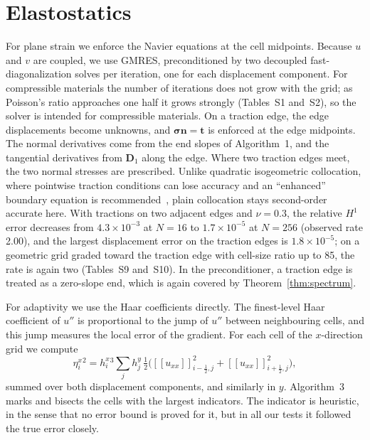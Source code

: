 \documentclass[preprint,12pt]{elsarticle}
\theoremstyle{remark}
\begin{document}
\section{Elastostatics}\label{sec:elast}
For plane strain we enforce the Navier equations at the cell midpoints. Because $u$ and $v$ are coupled,
we use GMRES, preconditioned by two decoupled fast-diagonalization solves per iteration, one for each
displacement component. For compressible materials the number of iterations does not grow with the grid;
as Poisson's ratio approaches one half it grows strongly (Tables~S1 and~S2), so the solver is intended for
compressible materials. On a traction edge, the edge displacements become unknowns, and
$\boldsymbol\sigma\mathbf n=\mathbf t$ is enforced at the edge midpoints. The normal derivatives come from
the end slopes of Algorithm~1, and the tangential derivatives from $\mathbf D_1$ along the edge. Where two traction
edges meet, the two normal stresses are prescribed. Unlike quadratic isogeometric collocation, where
pointwise traction conditions can lose accuracy and an ``enhanced'' boundary equation is
recommended~\cite{delorenzis2015isogeometric}, plain collocation stays second-order accurate here. With tractions on two adjacent edges and $\nu=0.3$,
the relative $H^1$ error decreases from $4.3\times10^{-3}$ at $N=16$ to $1.7\times10^{-5}$ at
$N=256$ (observed rate 2.00), and the largest displacement error on the traction edges is
$1.8\times10^{-5}$; on a geometric grid graded toward the traction edge with cell-size ratio up to
85, the rate is again two (Tables~S9 and~S10). In the preconditioner, a traction edge is treated as a zero-slope end,
which is again covered by Theorem~\ref{thm:spectrum}.

For adaptivity we use the Haar coefficients directly. The finest-level Haar coefficient of $u''$ is
proportional to the jump of $u''$ between neighbouring cells, and this jump measures the local error of
the gradient. For each cell of the $x$-direction grid we compute
\begin{equation}\label{eq:indicator}
\eta^x_i{}^2=h^x_i{}^3\sum_jh^y_j\,\tfrac12\Big([\![u_{xx}]\!]_{i-\frac12,j}^2+[\![u_{xx}]\!]_{i+\frac12,j}^2\Big),
\end{equation}
summed over both displacement components, and similarly in $y$. Algorithm~3 marks and bisects the cells
with the largest indicators. The indicator is heuristic, in the sense that no error bound is proved for it,
but in all our tests it followed the true error closely.
\end{document}
